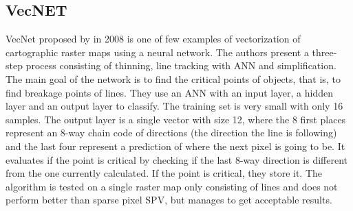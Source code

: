 \subsection{VecNET}
VecNet proposed by \citet{Karabork2008} in 2008 is one of few examples of vectorization of cartographic raster maps using a neural network. The authors present a three-step process consisting of thinning, line tracking with ANN and simplification. The main goal of the network is to find the critical points of objects, that is, to find breakage points of lines. They use an ANN with an input layer, a hidden layer and an output layer to classify. The training set is very small with only 16 samples. The output layer is a single vector with size 12, where the 8 first places represent an 8-way chain code of directions (the direction the line is following) and the last four represent a prediction of where the next pixel is going to be. It evaluates if the point is critical by checking if the last 8-way direction is different from the one currently calculated. If the point is critical, they store it. The algorithm is tested on a single raster map only consisting of lines and does not perform better than sparse pixel SPV, but manages to get acceptable results. 
